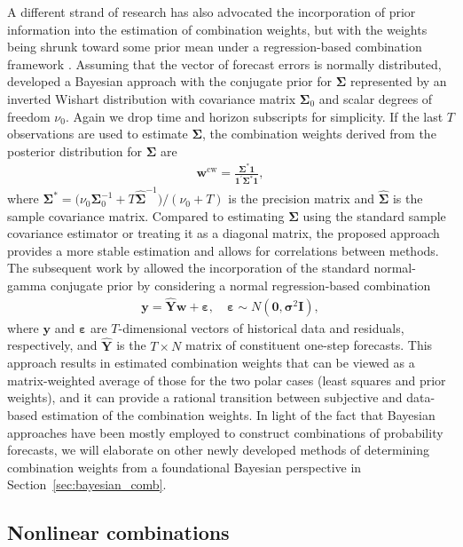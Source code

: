\documentclass[11pt]{article}
\begin{document}
A different strand of research has also advocated the incorporation of prior information into the estimation of combination weights, but with the weights being shrunk toward some prior mean under a regression-based combination framework \citep{Newbold2002-wa}. Assuming that the vector of forecast errors is normally distributed, \citet{Clemen1986-pd} developed a Bayesian approach with the conjugate prior for $\bm{\Sigma}$ represented by an inverted Wishart distribution with covariance matrix $\bm{\Sigma}_{0}$ and scalar degrees of freedom $\nu_{0}$. Again we drop time and horizon subscripts for simplicity. If the last $T$ observations are used to estimate $\bm{\Sigma}$, the combination weights derived from the posterior distribution for $\bm{\Sigma}$ are
\begin{align*}
  \bm{w}^{\text{cw}}=\frac{\bm{\Sigma}^{*}\bm{1}}{\bm{1}^{\prime} \bm{\Sigma}^{*} \bm{1}},
\end{align*}
where $\bm{\Sigma}^{*}=\big(\nu_{0} \bm{\Sigma}_{0}^{-1}+T \hat{\bm{\Sigma}}^{-1}\big) /(\nu_{0}+T)$ is the precision matrix and $\hat{\bm{\Sigma}}$ is the sample covariance matrix.
Compared to estimating $\bm{\Sigma}$ using the standard sample covariance estimator or treating it as a diagonal matrix, the proposed approach provides a more stable estimation and allows for correlations between methods. The subsequent work by \citet{Diebold1990-fk} allowed the incorporation of the standard normal-gamma conjugate prior by considering a normal regression-based combination
\begin{align*}
  \bm{y}=\hat{\bm{Y}} \bm{w}+\bm{\varepsilon}, \quad \bm{\varepsilon} \sim N\left(\bm{0}, \bm{\sigma}^{2} \bm{I}\right),
\end{align*}
where $\bm{y}$ and $\bm{\varepsilon}$ are $T$-dimensional vectors of historical data and residuals, respectively, and $\hat{\bm{Y}}$ is the $T \times N$ matrix of constituent one-step forecasts. This approach results in estimated combination weights that can be viewed as a matrix-weighted average of those for the two polar cases (least squares and prior weights), and it can provide a rational transition between subjective and data-based estimation of the combination weights. In light of the fact that Bayesian approaches have been mostly employed to construct combinations of probability forecasts, we will elaborate on other newly developed methods of determining combination weights from a foundational Bayesian perspective in Section~\ref{sec:bayesian_comb}.

\subsection{Nonlinear combinations}
\label{sec:nonlinear_comb}
\end{document}

